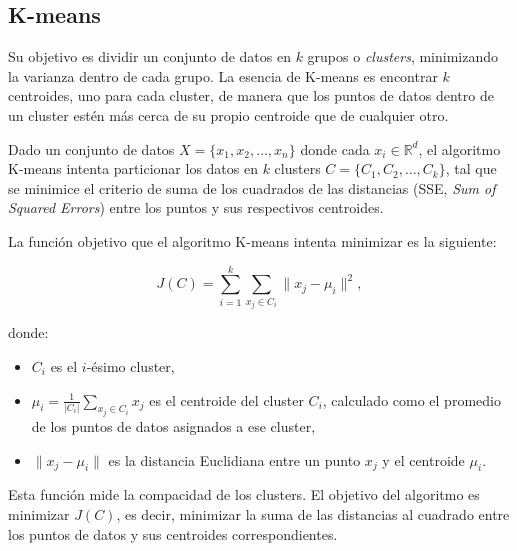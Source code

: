 \subsection{K-means}
Su objetivo es dividir un conjunto de datos en \(k\) grupos o \textit{clusters}, minimizando la varianza dentro de cada grupo. La esencia de K-means es encontrar \(k\) centroides, uno para cada cluster, de manera que los puntos de datos dentro de un cluster estén más cerca de su propio centroide que de cualquier otro.

Dado un conjunto de datos \(X = \{x_1, x_2, \dots, x_n\}\) donde cada \(x_i \in \mathbb{R}^d\), el algoritmo K-means intenta particionar los datos en \(k\) clusters \(C = \{C_1, C_2, \dots, C_k\}\), tal que se minimice el criterio de suma de los cuadrados de las distancias (SSE, \textit{Sum of Squared Errors}) entre los puntos y sus respectivos centroides.

La función objetivo que el algoritmo K-means intenta minimizar es la siguiente:

\[
J(C) = \sum_{i=1}^{k} \sum_{x_j \in C_i} \| x_j - \mu_i \|^2,
\]

donde:
\begin{itemize}
    \item \(C_i\) es el \(i\)-ésimo cluster,
    \item \(\mu_i = \frac{1}{|C_i|} \sum_{x_j \in C_i} x_j\) es el centroide del cluster \(C_i\), calculado como el promedio de los puntos de datos asignados a ese cluster,
    \item \(\| x_j - \mu_i \|\) es la distancia Euclidiana entre un punto \(x_j\) y el centroide \(\mu_i\).
\end{itemize}

Esta función mide la compacidad de los clusters. El objetivo del algoritmo es minimizar \(J(C)\), es decir, minimizar la suma de las distancias al cuadrado entre los puntos de datos y sus centroides correspondientes.


